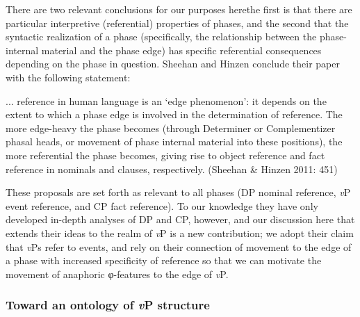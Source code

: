 \documentclass[output=paper
,modfonts
,nonflat
]{langsci/langscibook}
\begin{document}
There are two relevant conclusions for our purposes here\textemdash the first is that there are particular interpretive (referential) properties of phases, and the second that the syntactic realization of a phase (specifically, the relationship between the phase-internal material and the phase edge) has specific referential consequences depending on the phase in question. Sheehan and Hinzen conclude their paper with the following statement: 

\begin{displayquote}

\begin{small}
 ... reference in human language is an `edge phenomenon': it depends on the extent to which a phase edge is involved in the determination of reference. The more edge-heavy the phase becomes (through Determiner or Complementizer phasal heads, or movement of phase internal material into these positions), the more referential the phase becomes, giving rise to object reference and fact reference in nominals and clauses, respectively. (Sheehan \& Hinzen 2011: 451)

\end{small}

\end{displayquote}


These proposals are set forth as relevant to all phases (DP nominal reference, \textit{v}P event reference, and CP fact reference).  To our knowledge they have only developed in-depth analyses of DP and CP, however, and our discussion here that extends their ideas to the realm of \textit{v}P is a new contribution; we adopt their claim that \textit{v}Ps refer to events, and rely on their connection of movement to the edge of a phase with increased specificity of reference so that we can motivate the movement of anaphoric φ-features to the edge of \textit{v}P. 

\subsubsection{Toward an ontology of \textit{v}P structure}
\end{document}
